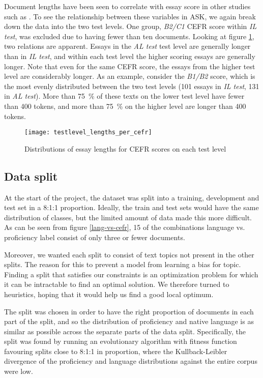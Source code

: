 Document lengths have been seen to correlate with essay score in other
studies such as \textcite{vajjala17}. To see the relationship between these
variables in ASK, we again break down the data into the two test levels. One
group, \emph{B2/C1} CEFR score within \emph{IL test}, was excluded due to
having fewer than ten documents. Looking at figure
\ref{testlevel-lengths-per-cefr}, two relations are apparent. Essays in the
\emph{AL test} test level are generally longer than in \emph{IL test}, and
within each test level the higher scoring essays are generally longer. Note
that even for the same CEFR score, the essays from the higher test level are
considerably longer. As an example, consider the \emph{B1/B2} score, which is
the most evenly distributed between the two test levels (101 essays in
\emph{IL test}, 131 in \emph{AL test}). More than 75~\% of these texts on
the lower test level have fewer than 400 tokens, and more than 75~\% on the
higher level are longer than 400 tokens.

\begin{figure}
  \centering
  \texttt{[image: testlevel\_lengths\_per\_cefr]}
  \caption{Distributions of essay lengths for CEFR scores on each test level}
  \label{testlevel-lengths-per-cefr}
\end{figure}


\subsection{Data split}

At the start of the project, the dataset was split into a training,
development and test set in a 8:1:1 proportion. Ideally, the train and test
sets would have the same distribution of classes, but the limited amount of
data made this more difficult. As can be seen from figure \ref{lang-vs-cefr},
15 of the combinations language vs. proficiency label consist of only three
or fewer documents.

Moreover, we wanted each split to consist of text topics not present in the
other splits. The reason for this to prevent a model from learning a bias for
topic. Finding a split that satisfies our constraints is an optimization
problem for which it can be intractable to find an optimal solution. We
therefore turned to heuristics, hoping that it would help us find a good
local optimum.
 
The split was chosen in order to have the right proportion of documents in
each part of the split, and so the distribution of proficiency and native
language is as similar as possible across the separate parts of the data
split. Specifically, the split was found by running an evolutionary algorithm
with fitness function favouring splits close to 8:1:1 in proportion, where
the Kullback-Leibler divergence of the proficiency and language distributions
against the entire corpus were low.

